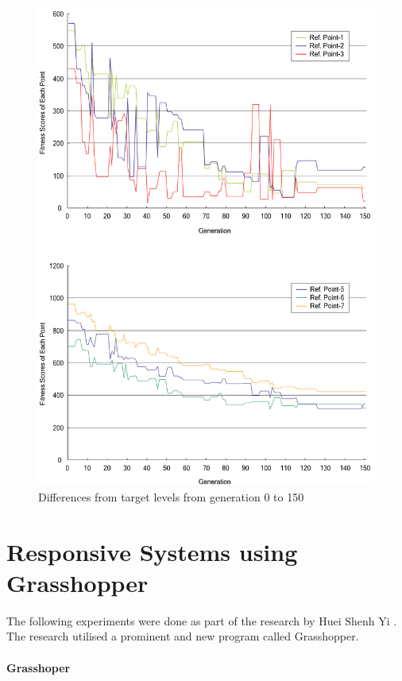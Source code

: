 \begin{figure}[h]
\centering
\includegraphics[width=\textwidth]{./Images/30-RFDSdiff}
\caption[RFDS Target Level Differences]{Differences from target levels from generation 0 to 150 \cite{kawakita01}}
\label{fig:RFDSdiff}
\end{figure}


\clearpage
\section{Responsive Systems using Grasshopper}

The following experiments were done as part of the research by Huei Shenh Yi \cite{yi09}. The research utilised a prominent and new program called Grasshopper.

\paragraph{Grasshoper}\mbox{}

